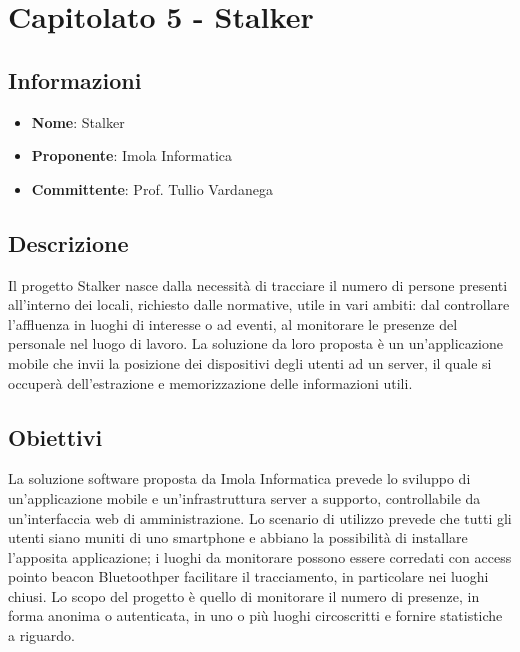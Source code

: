 \section{Capitolato 5 - Stalker}

\subsection{Informazioni}
\begin{itemize}
	\item \textbf{Nome}: Stalker
	\item \textbf{Proponente}: Imola Informatica
	\item \textbf{Committente}: Prof. Tullio Vardanega
\end{itemize}

\subsection{Descrizione}
Il progetto Stalker nasce dalla necessità di tracciare il numero di persone presenti all'interno dei locali, richiesto dalle normative, utile in vari ambiti: dal controllare l'affluenza in luoghi di interesse o ad eventi, al monitorare le presenze del personale nel luogo di lavoro. La soluzione da loro proposta è un un'applicazione mobile che invii la posizione dei dispositivi degli utenti ad un server, il quale si occuperà dell'estrazione e memorizzazione delle informazioni utili.

\subsection{Obiettivi}
La soluzione software proposta da Imola Informatica prevede lo sviluppo di un'applicazione mobile e un'infrastruttura server a supporto, controllabile da un'interfaccia web di amministrazione. Lo scenario di utilizzo prevede che tutti gli utenti siano muniti di uno smartphone e abbiano la possibilità di installare l'apposita applicazione; i luoghi da monitorare possono essere corredati con access point\glosp o beacon Bluetooth\glosp per facilitare il tracciamento, in particolare nei luoghi chiusi. Lo scopo del progetto è quello di monitorare il numero di presenze, in forma anonima o autenticata, in uno o più luoghi circoscritti e fornire statistiche a riguardo.

